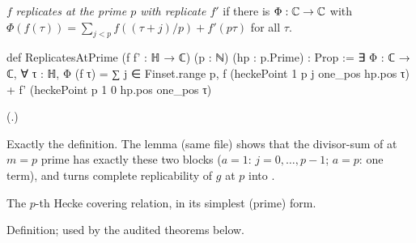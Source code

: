 \begin{definition}\label{ch16:def:repprime}
$f$ \emph{replicates at the prime $p$ with replicate $f'$} if there is $\Phi:{\mathbb{C}}\to{\mathbb{C}}$ with
$\Phi(f(\tau))=\sum_{j<p}f((\tau+j)/p)+f'(p\tau)$ for all $\tau$.
\end{definition}
\begin{leancode}
def ReplicatesAtPrime (f f' : ℍ → ℂ) (p : ℕ) (hp : p.Prime) : Prop :=
  ∃ Φ : ℂ → ℂ, ∀ τ : ℍ, Φ (f τ) = ∑ j ∈ Finset.range p, f (heckePoint 1 p j one_pos hp.pos τ) +
    f' (heckePoint p 1 0 hp.pos one_pos τ)
\end{leancode}
(.)
\begin{dictionary}
Exactly the definition.  The lemma  (same file) shows that the divisor-sum of
 at $m=p$ prime has exactly these two blocks ($a=1$: $j=0,\dots,p-1$; $a=p$: one term),
and  turns complete replicability of $g$ at $p$ into
.
\end{dictionary}
\begin{physics}
The $p$-th Hecke covering relation, in its simplest (prime) form.
\end{physics}
\begin{status}
Definition; used by the audited theorems below.
\end{status}

